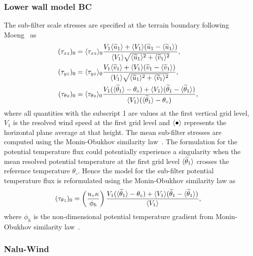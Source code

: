 \subsubsection{\label{sec:wallmodelBC}Lower wall model BC}
The sub-filter scale stresses are specified at the terrain boundary following
Moeng~\cite{Moeng1984} as
\begin{align}
 (\tau_{xz})_0 &= \langle \tau_{xz} \rangle_0 \frac{V_1 \langle \widetilde{u}_1 \rangle + \langle V_1 \rangle (\widetilde{u}_1 - \langle \widetilde{u}_1 \rangle ) }{ \langle V_1 \rangle \sqrt{\langle \widetilde{u}_1 \rangle^2 + \langle \widetilde{v}_1 \rangle^2 } } , \\
 (\tau_{yz})_0 &= \langle \tau_{yz} \rangle_0 \frac{V_1 \langle \widetilde{v}_1 \rangle + \langle V_1 \rangle (\widetilde{v}_1 - \langle \widetilde{v}_1 \rangle ) }{ \langle V_1 \rangle \sqrt{\langle \widetilde{u}_1 \rangle^2 + \langle \widetilde{v}_1 \rangle^2 } } , \\
  (\tau_{\theta z})_0 &= \langle \tau_{\theta z} \rangle_0 \frac{V_1 ( \langle \widetilde{\theta}_1 \rangle - \theta_{\circ} ) + \langle V_1 \rangle (\widetilde{\theta}_1 - \langle \widetilde{\theta}_1 \rangle ) }{ \langle V_1 \rangle ( \langle \widetilde{\theta}_1 \rangle - \theta_{\circ} ) },
\end{align}
where all quantities with the subscript 1 are values at the first vertical grid
level, $V_1$ is the resolved wind speed at the first grid level and
$\langle \bullet \rangle$ represents the horizontal plane average at that height. The mean
sub-filter stresses are computed using the Monin-Obukhov similarity
law~\cite{Etling1996}. The formulation for the potential temperature flux could
potentially experience a singularity when the mean resolved potential
temperature at the first grid level $\langle \widetilde{\theta}_1 \rangle$ crosses the
reference temperature $\theta_{\circ}$. Hence the model for the sub-filter
potential temperature flux is reformulated using the Monin-Obukhov similarity
law as
\begin{equation}
(\tau_{\theta z})_0 = \left ( \frac{u_{\tau} \kappa}{ \phi_h} \right ) \frac{V_1 ( \langle \widetilde{\theta}_1 \rangle - \theta_{\circ} ) + \langle V_1 \rangle (\widetilde{\theta}_1 - \langle \widetilde{\theta}_1 \rangle ) }{ \langle V_1 \rangle },
\end{equation}
where $\phi_h$ is the non-dimensional potential temperature gradient from
Monin-Obukhov similarity law~\cite{Etling1996}.


\subsubsection{Nalu-Wind}

